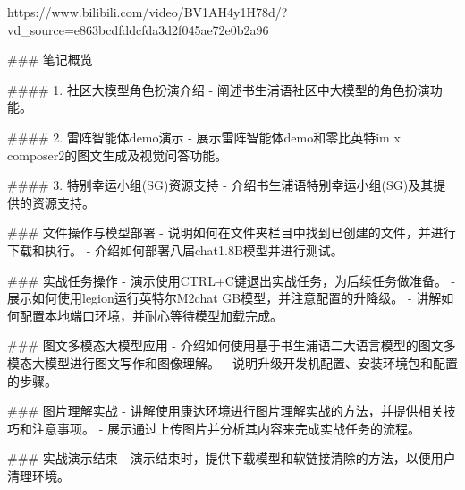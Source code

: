 https://www.bilibili.com/video/BV1AH4y1H78d/?vd_source=e863bcdfddcfda3d2f045ae72e0b2a96

### 笔记概览

#### 1. 社区大模型角色扮演介绍
- 阐述书生浦语社区中大模型的角色扮演功能。

#### 2. 雷阵智能体demo演示
- 展示雷阵智能体demo和零比英特im x composer2的图文生成及视觉问答功能。

#### 3. 特别幸运小组(SG)资源支持
- 介绍书生浦语特别幸运小组(SG)及其提供的资源支持。

### 文件操作与模型部署
- 说明如何在文件夹栏目中找到已创建的文件，并进行下载和执行。
- 介绍如何部署八届chat1.8B模型并进行测试。

### 实战任务操作
- 演示使用CTRL+C键退出实战任务，为后续任务做准备。
- 展示如何使用legion运行英特尔M2chat GB模型，并注意配置的升降级。
- 讲解如何配置本地端口环境，并耐心等待模型加载完成。

### 图文多模态大模型应用
- 介绍如何使用基于书生浦语二大语言模型的图文多模态大模型进行图文写作和图像理解。
- 说明升级开发机配置、安装环境包和配置的步骤。

### 图片理解实战
- 讲解使用康达环境进行图片理解实战的方法，并提供相关技巧和注意事项。
- 展示通过上传图片并分析其内容来完成实战任务的流程。

### 实战演示结束
- 演示结束时，提供下载模型和软链接清除的方法，以便用户清理环境。
